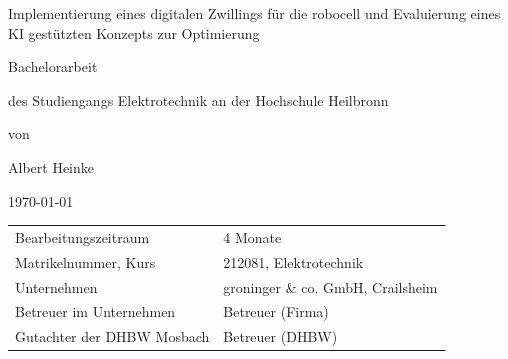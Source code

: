 \begin{titlepage}

\begin{singlespace}
    




\vspace{1cm}
\centering
\fontsize{30}{27} \selectfont Implementierung eines digitalen Zwillings für die robocell und Evaluierung eines KI gestützten Konzepts zur Optimierung  
 \par
\vspace{1.5cm}
\fontsize{36}{33} \selectfont Bachelorarbeit \par
\vspace{1.5cm}
\fontsize{16}{20} \selectfont  des Studiengangs Elektrotechnik
an der Hochschule Heilbronn
\vspace{1.5cm}

\fontsize{18}{22} \selectfont von \par
\fontsize{20}{25} \selectfont Albert Heinke\par
\vspace{1.5cm}
\fontsize{18}{22} \selectfont \today \par
\vfill

\fontsize{13}{18} \selectfont
\begin{tabular}{ l  l }
  Bearbeitungszeitraum & \hspace{0.85cm} 4 Monate \\
  Matrikelnummer, Kurs & \hspace{0.85cm} 212081, Elektrotechnik \\
  Unternehmen & \hspace{0.85cm} groninger \& co. GmbH, Crailsheim \\
  Betreuer im Unternehmen & \hspace{0.85cm} Betreuer (Firma) \\
  Gutachter der DHBW Mosbach & \hspace{0.85cm} Betreuer (DHBW) \\
\end{tabular}


\end{singlespace}
\end{titlepage}
